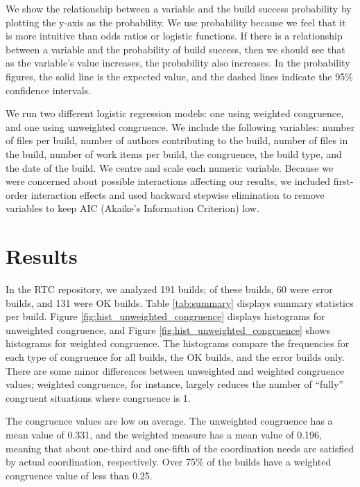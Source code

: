 We show the relationship between a variable and the build success probability by plotting the y-axis as the probability. We use probability because we feel that it is more intuitive than odds ratios or logistic functions. If there is a relationship between a variable and the probability of build success, then we should see that as the variable's value increases, the probability also increases. In the probability figures, the solid line is the expected value, and the dashed lines indicate the 95\% confidence intervals.

We run two different logistic regression models: one using weighted congruence, and one using unweighted congruence. We include the following variables: number of files per build, number of authors contributing to the build, number of files in the build, number of work items per build, the congruence, the build type, and the date of the build. We centre and scale each numeric variable.
Because we were concerned about possible interactions affecting our results, we included first-order interaction effects and used backward stepwise elimination to remove variables to keep AIC (Akaike's Information Criterion) low.

\section{Results}
\label{sec:results}
In the RTC repository, we analyzed 191 builds; of these builds, 60 were error builds, and 131 were OK builds. Table \ref{tab:summary} displays summary statistics per build.
Figure \ref{fig:hist_unweighted_congruence} displays histograms for unweighted congruence, and Figure \ref{fig:hist_unweighted_congruence} shows histograms for weighted congruence. The histograms compare the frequencies for each type of congruence for all builds, the OK builds, and the error builds only. There are some minor differences between unweighted and weighted congruence values; weighted congruence, for instance, largely reduces the number of ``fully'' congruent situations where congruence is 1.

The congruence values are low on average. The unweighted congruence has a mean value of 0.331, and the weighted measure has a mean value of 0.196, meaning that about one-third and one-fifth of the coordination needs are satisfied by actual coordination, respectively. Over 75\% of the builds have a weighted congruence value of less than 0.25.

